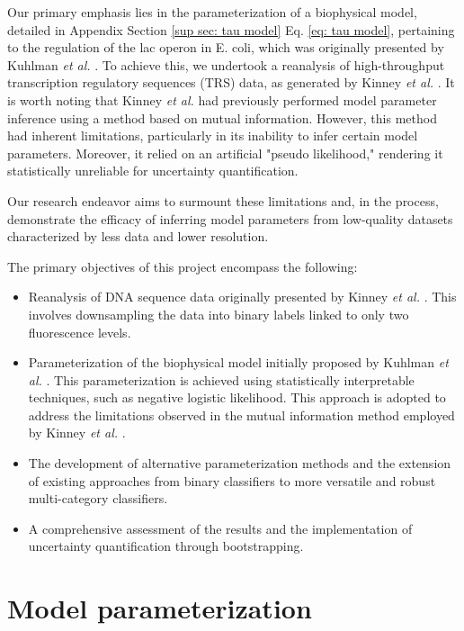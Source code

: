 \documentclass{article}
\begin{document}
Our primary emphasis lies in the parameterization of a biophysical model, detailed in Appendix Section \ref{sup sec: tau model} Eq. \ref{eq: tau model}, pertaining to the regulation of the lac operon in E. coli, which was originally presented by Kuhlman \textit{et al.} \cite{Kuhlman2007PNAS}. To achieve this, we undertook a reanalysis of high-throughput transcription regulatory sequences (TRS) data, as generated by Kinney \textit{et al.} \cite{Kinney2010PNAS}. It is worth noting that Kinney \textit{et al.} had previously performed model parameter inference using a method based on mutual information. However, this method had inherent limitations, particularly in its inability to infer certain model parameters. Moreover, it relied on an artificial "pseudo likelihood," rendering it statistically unreliable for uncertainty quantification.

Our research endeavor aims to surmount these limitations and, in the process, demonstrate the efficacy of inferring model parameters from low-quality datasets characterized by less data and lower resolution.

The primary objectives of this project encompass the following:

\begin{itemize}
\item Reanalysis of DNA sequence data originally presented by Kinney \textit{et al.} \cite{Kinney2010PNAS}. This involves downsampling the data into binary labels linked to only two fluorescence levels.
\item Parameterization of the biophysical model initially proposed by Kuhlman \textit{et al.} \cite{Kuhlman2007PNAS}. This parameterization is achieved using statistically interpretable techniques, such as negative logistic likelihood. This approach is adopted to address the limitations observed in the mutual information method employed by Kinney \textit{et al.} \cite{Kinney2010PNAS}.
\item The development of alternative parameterization methods and the extension of existing approaches from binary classifiers to more versatile and robust multi-category classifiers.
\item A comprehensive assessment of the results and the implementation of uncertainty quantification through bootstrapping.
\end{itemize}

\section{Model parameterization}
\end{document}
